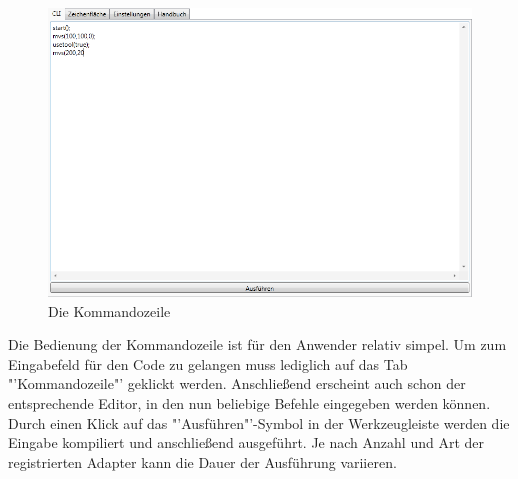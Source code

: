 \begin{figure}[H]
  \centering
  \begin{minipage}[t]{12 cm}
  	\centering
  	\includegraphics[width=12cm]{images/CLI} 
    \caption{Die Kommandozeile}
  \end{minipage}
\end{figure}

Die Bedienung der Kommandozeile ist für den Anwender relativ simpel. Um zum Eingabefeld für den Code zu gelangen muss lediglich auf das Tab "'Kommandozeile"' geklickt werden. Anschließend erscheint auch schon der entsprechende Editor, in den nun beliebige Befehle eingegeben werden können. Durch einen Klick auf das "'Ausführen"'-Symbol in der Werkzeugleiste werden die Eingabe kompiliert und anschließend ausgeführt. Je nach Anzahl und Art der registrierten Adapter kann die Dauer der Ausführung variieren.

